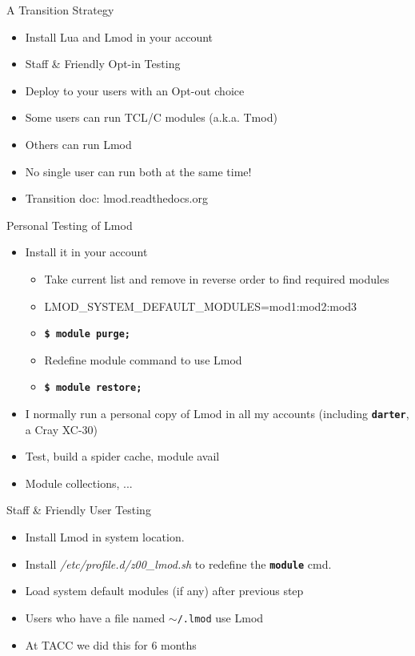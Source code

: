 \documentclass{beamer}
\begin{document}
\begin{frame}{A Transition Strategy}
  \begin{itemize}
    \item Install Lua and Lmod in your account
    \item Staff \& Friendly Opt-in Testing
    \item Deploy to your users with an Opt-out choice
    \item Some users can run TCL/C modules (a.k.a. Tmod)
    \item Others can run Lmod
    \item No single user can run both at the same time!
    \item Transition doc: lmod.readthedocs.org
  \end{itemize}
\end{frame}

\begin{frame}{Personal Testing of Lmod}
  \begin{itemize}
    \item Install it in your account
      \begin{itemize}
        \item Take current list and remove in reverse order to find
          required modules
        \item LMOD\_SYSTEM\_DEFAULT\_MODULES=mod1:mod2:mod3
        \item \texttt{\bf \$ module purge;}
        \item Redefine module command to use Lmod
        \item \texttt{\bf \$ module restore;}
      \end{itemize}
    \item I normally run a personal copy of Lmod in all my accounts
      (including \texttt{\bf darter}, a Cray XC-30)
    \item Test, build a spider cache, module avail
    \item Module collections, ...
  \end{itemize}
\end{frame}

\begin{frame}{Staff \& Friendly User Testing}
  \begin{itemize}
    \item Install Lmod in system location.
    \item Install \emph{/etc/profile.d/z00\_lmod.sh} to redefine the
      \texttt{\bf module} cmd.
    \item Load system  default modules (if any) after previous step
    \item Users who have a file named \texttt{$\sim$/.lmod} use Lmod
    \item At TACC we did this for 6 months
  \end{itemize}
\end{frame}
\end{document}
